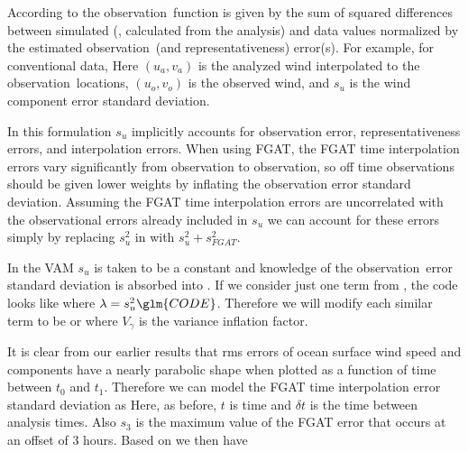 \documentclass[12pt,titlepage]{article}
\begin{document}
\appendix


  \renewcommand{\vardef}[3]{$ {#1} $ is the {#2}}
  \newcommand{\Obs}{Observation}
  \newcommand{\obs}{observation}

According to \citet{HofLH+03} the \obs\ function is given by the sum of
squared differences between simulated (\ie, calculated from the
analysis) and data values normalized by the estimated \obs\ (and
representativeness) error(s).
 For example, for conventional data,
 Here
 \vardef{(u_a, v_a)}{analyzed wind interpolated to the \obs\
locations,}{m s^{-1}}
 \vardef{(u_o, v_o)}{observed wind, and}{m s^{-1}}
 \vardef{s_u}{wind component error standard deviation.}{m s^{-1}}

In this formulation $s_u$ implicitly accounts for observation error,
representativeness errors, and interpolation errors.
When using FGAT, the FGAT time interpolation errors vary significantly
from observation to observation, so off time observations should be
given lower weights by inflating the observation error standard
deviation.
Assuming the FGAT time interpolation errors are uncorrelated with the
observational errors already included in $s_u$ we can account for
these errors simply by replacing $s_u^2$ in \eqr{Jconv} with $s_u^2 +
s_{FGAT}^2$. 

In the VAM $s_u$ is taken to be a constant  and
knowledge of the \obs\ error standard deviation is absorbed into
\glm{CONV}.
If we consider just one term from , the 
code looks like
where $\lambda = s_u^2 \glm{CODE}$.
Therefore we will modify each similar term to be
or
where $V_{\gamma}$ is the variance inflation factor.

It is clear from our earlier results that rms errors of ocean
surface wind speed and components have a nearly parabolic shape when
plotted as a function of time between $t_0$ and $t_1$.
Therefore we can model the FGAT time interpolation error standard
deviation as
Here, as before, $t$ is time and $\delta t$ is the time between
analysis times.
Also $s_3$ is the maximum value of the FGAT error that occurs at an
offset of 3 hours.
Based on  we then have
\end{document}
